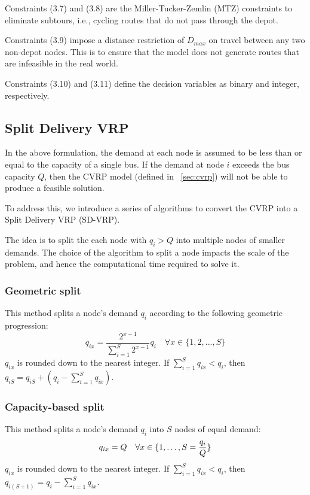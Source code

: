 \documentclass[12pt]{article}
\begin{document}
Constraints (3.7) and (3.8) are the Miller-Tucker-Zemlin (MTZ) constraints to eliminate subtours,
i.e., cycling routes that do not pass through the depot.

Constraints (3.9) impose a distance restriction of $D_{max}$ on travel between any two non-depot nodes.
This is to ensure that the model does not generate routes that are infeasible in the real world.

Constraints (3.10) and (3.11) define the decision variables as binary and integer, respectively.

\subsection{Split Delivery VRP}
In the above formulation, the demand at each node is assumed to be less than or equal to the capacity of a single bus.
If the demand at node $i$ exceeds the bus capacity $Q$, then the CVRP model (defined in ~\autoref{sec:cvrp}) will not be able to produce a feasible solution.

To address this, we introduce a series of algorithms to convert the CVRP into a Split Delivery VRP (SD-VRP).

The idea is to split the each node with $q_i > Q$ into multiple nodes of smaller demands. The choice of the algorithm to split a node impacts the scale of the problem, and hence the computational time required to solve it.

\subsubsection{Geometric split}
This method splits a node's demand $q_i$ according to the following geometric progression:
\begin{equation}
    q_{ix} = \frac{2^{x-1}}{\sum_{i=1}^{S} 2^{x-1}} q_{i} \quad \forall x \in \{1, 2, ..., S\}
\end{equation}
$q_{ix}$ is rounded down to the nearest integer. If $\sum_{i=1}^{S} q_{ix} < q_{i}$, then $q_{iS} = q_{iS} + (q_{i} - \sum_{i=1}^{S} q_{ix})$.

\subsubsection{Capacity-based split}
This method splits a node's demand $q_i$ into $S$ nodes of equal demand:
\begin{equation}
    q_{ix} = Q  \quad \forall x \in \{1, \dots, S = \frac{q_{i}}{Q}\} \\
\end{equation}
$q_{ix}$ is rounded down to the nearest integer. If $\sum_{i=1}^{S} q_{ix} < q_{i}$, then $q_{i(S+1)} = q_{i} - \sum_{i=1}^{S} q_{ix}$.
\end{document}
